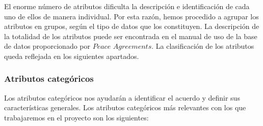 \documentclass[11pt]{article}
\begin{document}
El enorme número de atributos dificulta la descripción e identificación de cada uno de ellos de manera individual. Por esta razón, hemos procedido a agrupar los atributos en grupos, según el tipo de datos que los constituyen. La descripción de la totalidad de los atributos puede ser encontrada en el manual de uso \cite{manual} de la base de datos proporcionado por $\textit{Peace Agreements}$. La clasificación de los atributos queda reflejada en los siguientes apartados.

\subsubsection{Atributos categóricos}

Los atributos categóricos nos ayudarán a identificar el acuerdo y definir sus características generales. Los atributos categóricos más relevantes con los que trabajaremos en el proyecto son los siguientes:
\end{document}
